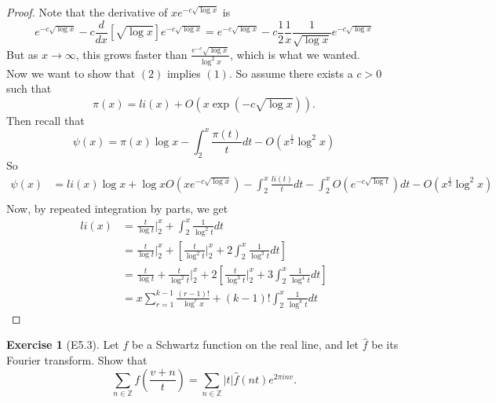 \documentclass[reqno]{amsart}
\theoremstyle{definition}
\newtheorem{exercise}[theorem]{Exercise}
\theoremstyle{remark}
\begin{document}
\begin{proof}
Note that the derivative of
$x e^{-c \sqrt{\log x} }$ is 
\[
e^{-c \sqrt{\log x} } - c \frac{d}{dx} \left[ \sqrt{\log x} 
\right] e^{-c \sqrt{\log x} }
= e^{-c \sqrt{\log x} }
-c \frac{1}{2} \frac{1}{x} \frac{1}{\sqrt{\log x} }
e^{-c \sqrt{\log x } }
\] 
But as
$x \to \infty$, this grows
faster than
$\frac{e^{-c} \sqrt{\log x} }{\log^2 x}$, which
is what we wanted.\\
\linebreak
Now we want to show that
$(2)$ implies $(1)$. So assume
there exists a $c> 0$ such that
\[
\pi(x) = li(x) + O\left( x \exp\left( -c \sqrt{\log x} 
\right) \right) .
\] 
Then recall that
\[
\psi (x) = 
\pi(x) \log x - \int_{2}^{x} \frac{\pi(t)}{t} dt
- O\left( x^{\frac{1}{2}} \log^2 x \right) 
\] 
So
\begin{align*}
    \psi (x)
    &= li(x) \log x + \log x O\left( xe^{-c \sqrt{\log x} } \right) 
    - \int_{2}^{x} \frac{li (t)}{t} dt
    - \int_{2}^{x} O\left( e^{-c \sqrt{\log t} } \right)dt
    - O\left( x^{\frac{1}{2}} \log^2 x \right) \\
\end{align*}
Now, by repeated integration by parts, we get
\begin{align*}
    li(x) 
    &= \frac{t}{\log t} \bigg|_{2}^{x}
    + \int_{2}^{x} \frac{1}{\log^2 t} dt\\
    &= \frac{t}{\log t}\bigg|_{2}^{x}
    + \left[ \frac{t}{\log^2 t} \bigg|_{2}^{x}
    + 2 \int_{2}^{x} \frac{1}{\log^3 t}dt \right] \\
    &= \frac{t}{\log t} + \frac{t}{\log^2 t}\bigg|_{2}^{x}
    + 2 \left[ \frac{t}{\log^3 t} \bigg|_{2}^{x}
    +  3 \int_{2}^{x} \frac{1}{\log^{4} t} dt  \right] \\
    &= x \sum_{r=1}^{k-1} \frac{(r-1)!}{\log^{r} x}
    + (k-1)! \int_{2}^{x}  \frac{1}{\log^{k} t} dt 
\end{align*}

\end{proof}




\begin{exercise}[E5.3]
    Let $f$ be a Schwartz function on the real line, and
    let $\hat{f}$ be its Fourier transform. Show that
    \[
        \sum_{n \in \mathbb{Z}} f \left( \frac{v+n}{t} \right) 
    = \sum_{n \in \mathbb{Z}} \left| t \right| 
    \hat{f}\left( nt \right) e^{2 \pi i n v}.
\]
\end{exercise}
\end{document}
